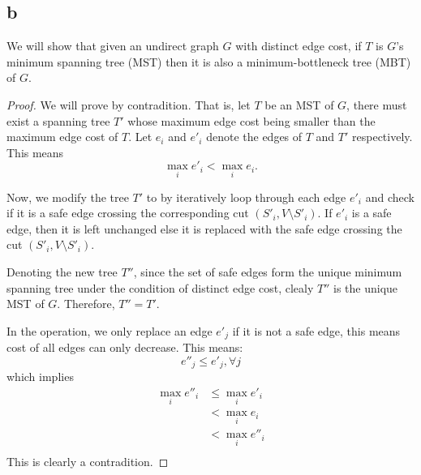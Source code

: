 \documentclass[a4paper,10pt,twoside]{article}
\newtheorem{proof}{Proof}
\begin{document}
\subsection*{b}
We will show that given an undirect graph $G$ with distinct edge
cost, if $T$ is $G$'s minimum spanning
tree (MST) then it is also a minimum-bottleneck tree (MBT) of $G$.
\begin{proof}
	We will prove by contradition. That is, let $T$ be an MST of $G$,
	there must exist a spanning tree $T'$ whose maximum edge cost
	being smaller than the maximum edge cost of $T$.
	Let $e_i$ and $e'_i$ denote the edges of $T$ and $T'$ respectively.
	This means
	\[
		\max_i{e'_i} < \max_i{e_i}.
	\]

	Now, we modify the tree $T'$ to by iteratively
	loop through each edge $e'_i$ and check if it is a safe edge crossing
	the corresponding cut $(S'_i, V\setminus S'_i)$. If $e'_i$ is a safe
	edge, then it is left unchanged else it is replaced with the safe edge
	crossing the cut $(S'_i, V\setminus S'_i)$.

	Denoting the new tree $T''$, since the set of safe edges form the unique
	minimum spanning tree under the condition of distinct edge cost, clealy
	$T''$ is the unique MST of $G$. Therefore, $T'' = T'$.

	In the operation, we only replace an edge $e'_j$ if it is not a safe edge,
	this means cost of all edges can only decrease. This means:
	\[
		e''_j \leq e'_j, \forall j
	\]
	which implies
	\[
	\begin{aligned}
		\max_i e''_i &\leq \max_i e'_i \\
					 &< \max_i e_i\\
					 &< \max_i e''_i\\
	\end{aligned}
	\]
	This is clearly a contradition.
\end{proof}
\end{document}

